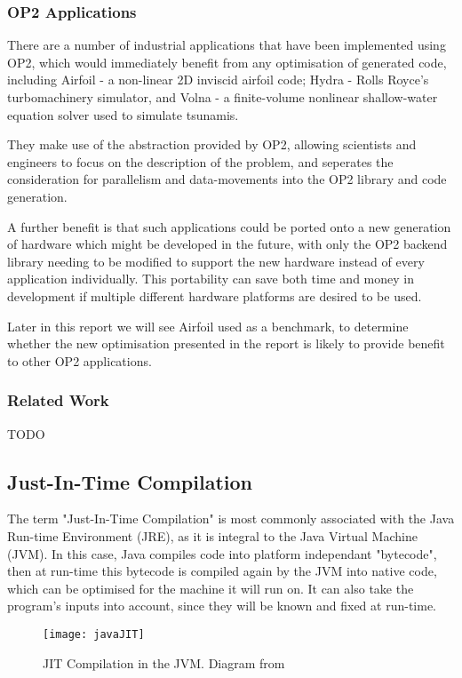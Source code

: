 \subsubsection{OP2 Applications}
There are a number of industrial applications that have been implemented using OP2, which would immediately benefit from any optimisation of generated code, including Airfoil \cite{airfoil} - a non-linear 2D inviscid airfoil code; Hydra \cite{hydra} - Rolls Royce’s turbomachinery simulator, and Volna \cite{volna} - a finite-volume nonlinear shallow-water equation solver used to simulate tsunamis.
\par
They make use of the abstraction provided by OP2, allowing scientists and engineers to focus on the description of the problem, and seperates the consideration for parallelism and data-movements into the OP2 library and code generation.
\par
A further benefit is that such applications could be ported onto a new generation of hardware which might be developed in the future, with only the OP2 backend library needing to be modified to support the new hardware instead of every application individually. This portability can save both time and money in development if multiple different hardware platforms are desired to be used.
\par
Later in this report we will see Airfoil used as a benchmark, to determine whether the new optimisation presented in the report is likely to provide benefit to other OP2 applications.

\subsubsection{Related Work}
TODO

\subsection{Just-In-Time Compilation}
\label{ss:rw_JIT}

\hspace{\parindent}
The term "Just-In-Time Compilation" is most commonly associated with the Java Run-time Environment (JRE), as it is integral to the Java Virtual Machine (JVM). In this case, Java compiles code into platform independant "bytecode", then at run-time this bytecode is compiled again by the JVM into native code, which can be optimised for the machine it will run on. It can also take the program's inputs into account, since they will be known and fixed at run-time.
\begin{figure}[h!]
  \centering
  \texttt{[image: javaJIT]}
  \caption{\label{fig:javaJIT} JIT Compilation in the JVM. Diagram from \cite{javaJITsrc}}
\end{figure}

